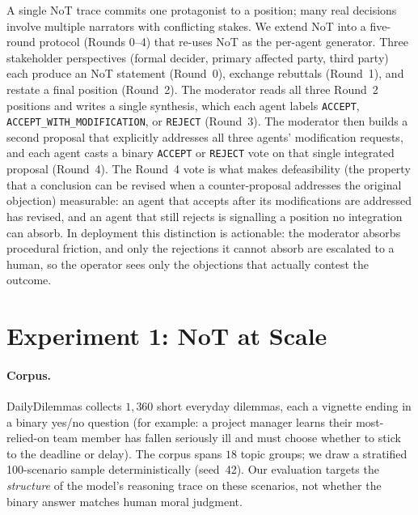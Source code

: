 \documentclass[11pt]{article}
\begin{document}
A single NoT trace commits one protagonist to a position; many real
decisions involve multiple narrators with conflicting stakes. We
extend NoT into a five-round protocol (Rounds 0--4) that re-uses
NoT as the per-agent generator. Three stakeholder perspectives
(formal decider, primary affected party, third party) each produce
an NoT statement (Round~0), exchange rebuttals (Round~1), and
restate a final position (Round~2). The moderator reads all three
Round~2 positions and writes a single synthesis, which each agent
labels \texttt{ACCEPT}, \texttt{ACCEPT\_WITH\_MODIFICATION}, or
\texttt{REJECT} (Round~3). The moderator then builds a second
proposal that explicitly addresses all three agents' modification
requests, and each agent casts a binary \texttt{ACCEPT} or
\texttt{REJECT} vote on that single integrated proposal (Round~4).
The Round~4 vote is what makes defeasibility (the property that a
conclusion can be revised when a counter-proposal addresses the
original objection) measurable: an agent that accepts after its
modifications are addressed has revised, and an agent that still
rejects is signalling a position no integration can absorb. In
deployment this distinction is actionable: the moderator absorbs
procedural friction, and only the rejections it cannot absorb are
escalated to a human, so the operator
sees only the objections that actually contest the outcome.

\section{Experiment 1: NoT at Scale}
\label{sec:exp1}

\paragraph{Corpus.} DailyDilemmas \citep{chiu24,chiu24data}
collects $1{,}360$ short everyday dilemmas, each a vignette ending in
a binary yes/no question (for example: a project manager learns their
most-relied-on team member has fallen seriously ill and must choose
whether to stick to the deadline or delay). The corpus spans $18$
topic groups; we draw a stratified 100-scenario sample
deterministically (seed~42). Our evaluation targets the \emph{structure}
of the model's reasoning trace on these scenarios, not whether the
binary answer matches human moral judgment.
\end{document}
